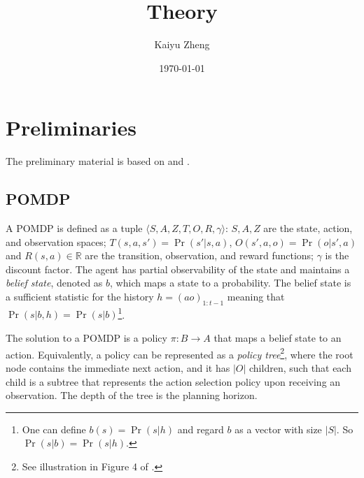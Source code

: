 \documentclass{article}
\title{Theory}
\author{Kaiyu Zheng}
\date{\today}
\begin{document}
\maketitle

\section{Preliminaries}

The preliminary material is based on \citet{kaelbling1998planning} and \citet{pineau2003point}.

\subsection{POMDP}
A POMDP is defined as a tuple
$\langle S, A, Z, T, O, R, \gamma \rangle$: $S, A, Z$ are the state,
action, and observation spaces; $T(s,a,s')=\Pr(s'|s,a)$, $O(s',a,o)=\Pr(o|s',a)$
and $R(s,a)\in\mathbb{R}$ are the transition, observation, and reward functions;
$\gamma$ is the discount factor. The agent has partial observability of the
state and maintains a \emph{belief state}, denoted as $b$, which maps a state to
a probability. The belief state is a sufficient statistic for the history $h=(ao)_{1:t-1}$
meaning that $\Pr(s|b,h)=\Pr(s|b)$\footnote{One can define $b(s)=\Pr(s|h)$ and regard $b$ as a vector with size $|S|$. So $\Pr(s|b)=\Pr(s|h)$.}.


The solution to a POMDP is a policy $\pi:B\rightarrow A$ that maps a belief
state to an action. Equivalently, a policy can be represented as a \emph{policy tree}\footnote{See illustration in Figure 4 of
  \citet{kaelbling1998planning}.}, where the root node contains the immediate
next action, and it has $|O|$ children, such that each child is a subtree that represents the action selection policy upon receiving an observation. The depth of the tree is the planning horizon.
\end{document}
